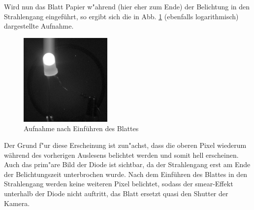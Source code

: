 Wird nun das Blatt Papier w"ahrend (hier eher zum Ende) der Belichtung in den Strahlengang eingeführt, so ergibt sich die in Abb. \ref{fig:smear3} (ebenfalls logarithmisch) dargestellte Aufnahme. 

\begin{figure}[h!]
\centering
        \includegraphics[width=.4\textwidth]{smear_oben2.png}
\caption{ Aufnahme nach Einführen des Blattes }
\label{fig:smear3}
\end{figure}
Der Grund f"ur diese Erscheinung ist zun"achst, dass die oberen Pixel wiederum während des vorherigen Auslesens belichtet werden und somit hell erscheinen. Auch das prim"are Bild der Diode ist sichtbar, da der Strahlengang erst am Ende der Belichtungszeit unterbrochen wurde. Nach dem Einführen des Blattes in den Strahlengang werden keine weiteren Pixel belichtet, sodass der smear-Effekt unterhalb der Diode nicht auftritt, das Blatt ersetzt quasi den Shutter der Kamera. 
